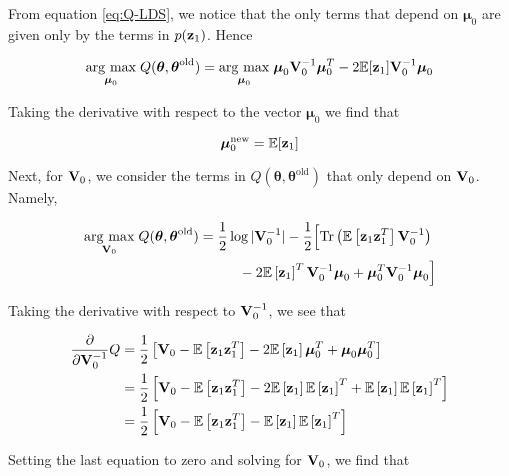 \documentclass[11pt]{article}
\newcommand{\argmax}[1]{\underset{#1}{\operatorname{arg}\,\operatorname{max}}\;}
\newcommand{\expectation}[1]{\mathbb{E}\left[#1\right]}
\begin{document}
From equation \ref{eq:Q-LDS}, we notice that the only terms that depend on $\boldsymbol{\mu}_0$ are given only by the terms in $p({\bf z}_1)$. Hence

\begin{align}
	\argmax{\boldsymbol{\mu}_0} Q(\boldsymbol\theta, \boldsymbol\theta^\text{old}) = \argmax{\boldsymbol{\mu}_0} \boldsymbol{\mu}_0 {\bf V}_0^{-1}\boldsymbol{\mu}_0^T -2\mathbb{E}[{{\bf z}_1}]{\bf V}_0^{-1}\boldsymbol{\mu}_0 \nonumber
\end{align}

Taking the derivative with respect to the vector $\boldsymbol{\mu}_0$ we find that

\begin{equation}
	\boldsymbol{\mu}_0^\text{new} = \mathbb{E}[{{\bf z}_1}]
\end{equation}

Next, for ${\bf V}_0$, we consider the terms in $Q(\boldsymbol\theta, \boldsymbol\theta^\text{old})$ that only depend on ${\bf V}_0$. Namely,

\begin{align}
	\argmax{{\bf V}_0} Q(\boldsymbol\theta, \boldsymbol\theta^\text{old}) &= \frac{1}{2}\log \vert
	  {\bf V}_0^{-1}\vert -\frac{1}{2}\Big[\text{Tr}\left(\mathbb{E}\left[{\bf z}_1 {\bf z}_1^T\right] {\bf V}_0^{-1}\right) \nonumber\\
	  &\hspace{1cm} -2 \mathbb{E}\left[{\bf z}_1\right]^T{\bf V}_0^{-1}\boldsymbol\mu_0 + \boldsymbol\mu_0^T {\bf V}_0^{-1}\boldsymbol\mu_0\Big] \nonumber
\end{align}

Taking the derivative with respect to ${\bf V}_0^{-1}$, we see that

\begin{align}
	\frac{\partial}{\partial {\bf V}_0^{-1}} Q &= \frac{1}{2}\left[{\bf V}_0 - \expectation{{\bf z}_1 {\bf z}_1^T} - 2\expectation{{\bf z}_1}\boldsymbol{\mu}_0^T + \boldsymbol{\mu}_0 \boldsymbol{\mu}_0^T \right] \nonumber \\
	&= \frac{1}{2} \left[{\bf V}_0 - \expectation{{\bf z}_1 {\bf z}_1^T} - 2\expectation{{\bf z}_1}\expectation{{\bf z}_1}^T + \expectation{{\bf z}_1}\expectation{{\bf z}_1}^T \right] \nonumber \\
	&= \frac{1}{2}\left[{\bf V}_0 - \expectation{{\bf z}_1 {\bf z}_1^T} - \expectation{{\bf z}_1}\expectation{{\bf z}_1}^T\right]
\end{align}

Setting the last equation to zero and solving for ${\bf V}_0$, we find that
\end{document}
